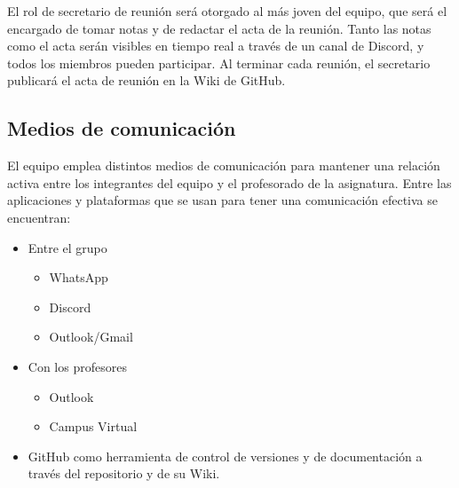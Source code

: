 \documentclass[../main.tex]{subfiles}
\begin{document}
El rol de secretario de reunión será otorgado al más joven del equipo, que será el encargado de tomar notas y de redactar el acta de la reunión. Tanto las notas como el acta serán visibles en tiempo real a través de un canal de Discord, y todos los miembros pueden participar. Al terminar cada reunión, el secretario publicará el acta de reunión en la Wiki de GitHub.\par

\subsection{Medios de comunicación}

El equipo emplea distintos medios de comunicación para mantener una relación activa entre los integrantes del equipo y el profesorado de la asignatura. Entre las aplicaciones y plataformas que se usan para tener una comunicación efectiva se encuentran:
\begin{itemize}
    \item Entre el grupo
    \begin{itemize}
        \item WhatsApp
        \item Discord
        \item Outlook/Gmail
    \end{itemize}

    \item Con los profesores
    \begin{itemize}
        \item Outlook
        \item Campus Virtual
    \end{itemize}
    \item GitHub como herramienta de control de versiones y de documentación a través del repositorio y de su Wiki.
\end{itemize}
\end{document}
